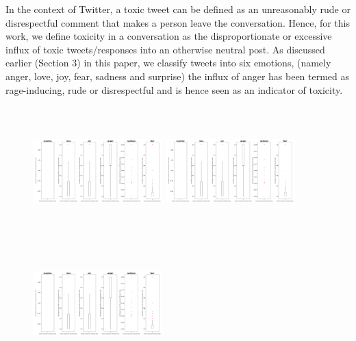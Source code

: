 \documentclass[acmtog]{acmart}
\begin{document}
In the context of Twitter, a toxic tweet can be defined as an unreasonably rude or disrespectful comment that makes a person leave the conversation. Hence, for this work, we define toxicity in a conversation as the disproportionate or excessive influx of toxic tweets/responses into an otherwise neutral post. As discussed earlier (Section 3) in this paper, we classify tweets into six emotions, (namely anger, love, joy, fear, sadness and surprise) the influx of anger has been termed as rage-inducing, rude or disrespectful and is hence seen as an indicator of toxicity.
\begin{figure}[h]
  \begin{minipage}{.33\textwidth}
    \centering
    \includegraphics[width=5cm,height=5cm,keepaspectratio]{anger.png}
  \end{minipage}%
  \begin{minipage}{.33\textwidth}
    \centering
    \includegraphics[width=5cm,height=5cm,keepaspectratio]{anger.png}
  \end{minipage}%
  \begin{minipage}{.33\textwidth}
    \centering
    \includegraphics[width=5cm,height=5cm,keepaspectratio]{anger.png}

\end{minipage}
\end{figure}
\end{document}
